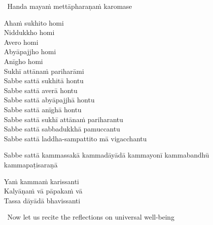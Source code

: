 \begin{leader}
  \anglebracketleft\ \hspace{-0.5mm}Handa mayaṁ mettāpharaṇaṁ karomase \hspace{-0.5mm}\anglebracketright\
\end{leader}

Ahaṁ sukhito homi\\
Niddukkho homi\\
Avero homi\\
Abyāpajjho homi\\
Anīgho homi\\
Sukhī attānaṁ pariharāmi\\
Sabbe sattā sukhitā hontu\\
Sabbe sattā averā hontu\\
Sabbe sattā abyāpajjhā hontu\\
Sabbe sattā anīghā hontu\\
Sabbe sattā sukhī attānaṁ pariharantu\\
Sabbe sattā sabbadukkhā pamuccantu\\
Sabbe sattā laddha-sampattito mā vigacchantu

\bigskip

\begin{pali-hangtogether}
  Sabbe sattā kammassakā kammadāyādā kammayonī kammabandhū kammapaṭisaraṇā\\
\end{pali-hangtogether}
Yaṁ kammaṁ karissanti\\
Kalyāṇaṁ vā pāpakaṁ vā\\
Tassa dāyādā bhavissanti

\clearpage

\begin{leader-english}
  \anglebracketleft\ \hspace{-0.5mm}Now let us recite the reflections on universal well-being \hspace{-0.5mm}\anglebracketright\
\end{leader-english}

